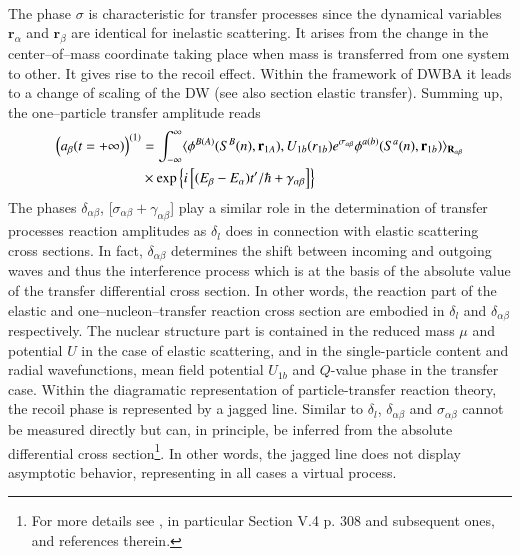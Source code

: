 \begin{subappendices}
\begin{align}
\end{align} 
 The phase $\sigma$ is characteristic for transfer processes since the dynamical variables $\mathbf r_\alpha$ and $\mathbf r_\beta$ are identical for inelastic scattering. It arises from the change in the center--of--mass coordinate taking place when mass is transferred from one system to other. It gives rise to the recoil effect. Within the framework of DWBA it leads to a change of scaling of the DW (see also section elastic transfer). Summing up, the one--particle transfer amplitude reads
 \begin{align}\label{eq1.D.37}
\nonumber \left(a_\beta(t=+\infty)\right)^{(1)}&=\int_{-\infty}^{\infty}\langle {\phi^{B(A)}(S^B(n),\mathbf r_{1A}),U_{1b}(r_{1b})e^{\sigma_{\alpha\beta}}\phi^{a(b)}(S^a(n),\mathbf r_{1b})} \rangle_{\mathbf R_{\alpha\beta}}\\
&\times\exp\left\{i\left[(E_\beta-E_\alpha)t'/\hbar+\gamma_{\alpha\beta}\right]\right\}
 \end{align}
 The phases $\delta_{\alpha\beta}$, [$\sigma_{\alpha\beta}+\gamma_{\alpha\beta}$] play a similar role in the determination of transfer processes reaction amplitudes as $\delta_l$ does in connection with elastic scattering cross sections. In fact, $\delta_{\alpha\beta}$ determines the shift between incoming and outgoing waves and thus the interference process which is at the basis of the absolute value of the transfer differential cross section. In other words, the reaction part of the elastic and one--nucleon--transfer reaction cross section are embodied in $\delta_l$ and $\delta_{\alpha\beta}$ respectively. The nuclear structure part is contained in the reduced mass $\mu$ and potential $U$ in the case of elastic scattering, and in the single-particle content and radial wavefunctions, mean field potential $U_{1b}$ and $Q$-value phase in the transfer case. Within the diagramatic representation of particle-transfer reaction theory, the recoil phase is represented by a jagged line. Similar to $\delta_l$, $\delta_{\alpha\beta}$  and $\sigma_{\alpha\beta}$ cannot be measured directly but can, in principle,  be inferred from the absolute differential cross section\footnote{For more details see \cite{Broglia:04a}, in particular Section V.4 p. 308 and subsequent ones, and references therein.}. In other words, the jagged line does not display asymptotic behavior, representing in all cases a virtual process.  
 
 
 

\end{subappendices}
